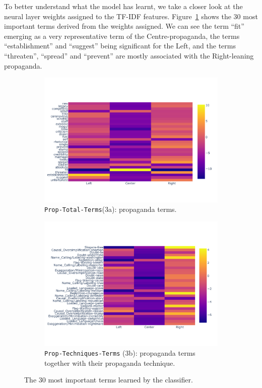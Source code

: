 To better understand what the model has learnt, we take a closer look at the neural layer weights assigned to the TF-IDF features.
Figure~\ref{fig:terms_weights_3a} shows the 30 most important terms derived from the weights assigned.
We can see the term ``fit'' emerging as a very representative term of the Centre-propaganda, the terms ``establishment'' and ``suggest'' being significant for the Left, and the terms ``threaten'', ``spread'' and ``prevent'' are mostly associated with the Right-leaning propaganda.


\begin{figure}[!htbp]
    \centering
    \begin{subfigure}[b]{\linewidth}
        \centering
        \includegraphics[width=0.75\linewidth]{figures/baly_media_weights_propaganda_tf_idf-small.pdf}
        \caption{\texttt{Prop-Total-Terms}(3a): propaganda terms.}
        \label{fig:terms_weights_3a}
    \end{subfigure}
    \begin{subfigure}[b]{\linewidth}
        \centering
        \includegraphics[width=0.75\linewidth]{figures/baly_media_weights_propaganda_techniques_tf_idf-small.pdf}
        \caption{\texttt{Prop-Techniques-Terms} (3b): propaganda terms together with their propaganda technique.}
        \label{fig:terms_weights_3b}
    \end{subfigure}
    \caption{The 30 most important terms learned by the classifier.}
    \label{fig:terms_weights}
\end{figure}

